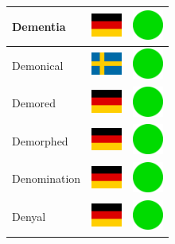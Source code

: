 \documentclass[12pt, a4paper, twoside]{report}
\begin{document}
\begin{center}
\begin{longtable}{|p{5cm}|p{2cm}|p{2cm}|}
 Dementia                                                   & \includegraphics[width=1cm]{../4x3/de} &   \includegraphics[width=1cm]{../likes/y} \\ \hline
 Demonical                                                  & \includegraphics[width=1cm]{../4x3/se} &   \includegraphics[width=1cm]{../likes/y} \\ \hline
 Demored                                                    & \includegraphics[width=1cm]{../4x3/de} &   \includegraphics[width=1cm]{../likes/y} \\ \hline
 Demorphed                                                  & \includegraphics[width=1cm]{../4x3/de} &   \includegraphics[width=1cm]{../likes/y} \\ \hline
 Denomination                                               & \includegraphics[width=1cm]{../4x3/de} &   \includegraphics[width=1cm]{../likes/y} \\ \hline
 Denyal                                                     & \includegraphics[width=1cm]{../4x3/de} &   \includegraphics[width=1cm]{../likes/y} \\ \hline

\end{longtable}
\end{center}
\end{document}
